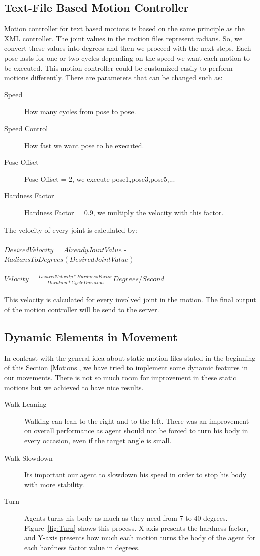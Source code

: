 \subsection{Text-File Based Motion Controller}
Motion controller for text based motions is based on the same principle as the XML controller. The joint values in the motion files represent radians. So, we convert these values into degrees and then we proceed with the next steps. Each pose lasts for one or two cycles depending on the speed we want each motion to be executed. This motion controller could be customized easily to perform motions differently. There are parameters that can be changed such as:
\begin{description}
	\item[Speed] How many cycles from pose to pose.
	\item[Speed Control] How fast we want pose to be executed.
	\item[Pose Offset] Pose Offset = 2, we execute pose1,pose3,pose5,...
	\item[Hardness Factor]	Hardness Factor = 0.9, we multiply the velocity with this factor.
\end{description}
The velocity of every joint is calculated by:\\
\\
$Desired Velocity$ = $Already Joint Value$ - $RadiansToDegrees(Desired Joint Value)$
\\
\\
$Velocity = \frac {Desired Velocity \ast Hardness Factor} {Duration
 \ast CycleDuration} Degrees/Second$\\
\\
This velocity is calculated for every involved joint in the motion. The final output of the motion controller will be send to the server.

\subsection{Dynamic Elements in Movement}
In contrast with the general idea about static motion files stated in the beginning of this Section \ref{Motions}, we have tried to implement some dynamic features in our movements. There is not so much room for improvement in these static motions but we achieved to have nice results.
\begin{description}
	\item[Walk Leaning] Walking can lean to the right and to the left. There was an improvement on overall performance as agent should not be forced to turn his body in every occasion, even if the target angle is small.
	\item[Walk Slowdown] Its important our agent to slowdown his speed in order to stop his body with more stability.
	\item[Turn]	Agents turns his body as much as they need from 7 to 40 degrees. Figure~\ref{fig:Turn} shows this process. X-axis presents the hardness factor, and Y-axis presents how much each motion turns the body of the agent for each hardness factor value in degrees.
\end{description} 


